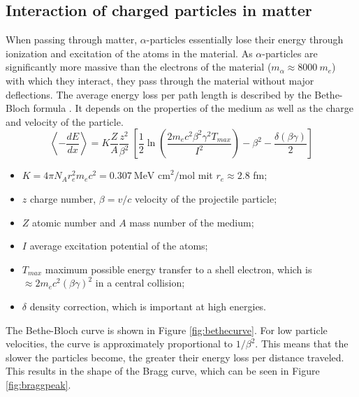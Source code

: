\subsection{Interaction of charged particles in matter}
When passing through matter, $\alpha$-particles essentially lose their energy through ionization and excitation of the atoms in the material. As $\alpha$-particles are significantly more massive than the electrons of the material ($m_\alpha \approx 8000\ m_{e}$) with which they interact, they pass through the material without major deflections. The average energy loss per path length is described by the Bethe-Bloch formula \cite{kolanoski}. It depends on the properties of the medium as well as the charge and velocity of the particle.
\begin{equation}
	\left\langle - \frac{dE}{dx} \right\rangle = K \frac{Z}{A} \frac{z^2}{\beta^2} \ \left[ \frac{1}{2} \ln \left( \frac{2 m_e c^2 \beta^2 \gamma^2 T_{max}}{I^2} \right) - \beta^2 - \frac{\delta(\beta\gamma)}{2} \right] 
\end{equation}
\begin{itemize}[itemsep=0pt, label=-]
	\item $K=4\pi N_A r_e^2 m_e c^2 = 0.307\ \text{MeV cm}^2 / \text{mol} $ mit $r_e \approx 2.8$ fm;
	\item $z$ charge number, $\beta = v / c$ velocity of the projectile particle;
	\item $Z$ atomic number and $A$ mass number of the medium;
	\item $I$ average excitation potential of the atoms;
	\item $T_{max}$ maximum possible energy transfer to a shell electron, which is $\approx 2 m_e c^2 (\beta\gamma)^2$ in a central collision;
	\item $\delta$ density correction, which is important at high energies.
\end{itemize}

The Bethe-Bloch curve is shown in Figure \ref{fig:bethecurve}. For low particle velocities, the curve is approximately proportional to $1/\beta^2$. This means that the slower the particles become, the greater their energy loss per distance traveled. This results in the shape of the Bragg curve, which can be seen in Figure \ref{fig:braggpeak}.

